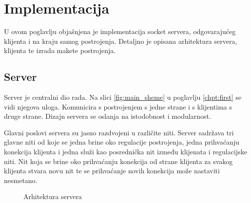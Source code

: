 \newpage
\chapter{Implementacija}

U ovom poglavlju objašnjena je implementacija socket servera, odgovarajućeg
klijenta i na kraju samog postrojenja.
Detaljno je opisana arhitektura servera, klijenta te izrada makete postrojenja.

\section{Server}

Server je centralni dio rada. Na slici \ref{fig:main_sheme} u poglavlju
\ref{chpt:first} se vidi njegova uloga. Komunicira s postrojenjem s jedne strane
i s klijentima s druge strane. Dizajn servera se oslanja na istodobnost i
modularnost.

Glavni poslovi servera su jasno razdvojeni u različite niti. Server
sadržava tri glavne niti od koje se jedna brine oko regulacije postrojenja,
jedna prihvaćanju konekcija klijenta i jedna služi kao posrednička nit između
klijenata i regulacijske niti. Nit koja se brine oko prihvaćanju konekcija od
strane klijenta za svakog klijenta stvara novu nit te se prihvaćanje novih
konekcija može nastaviti nesmetano.

\begin{figure}[H]
\centering
{}
\caption{Arhitektura servera}
\label{fig:architecture}
\end{figure}

